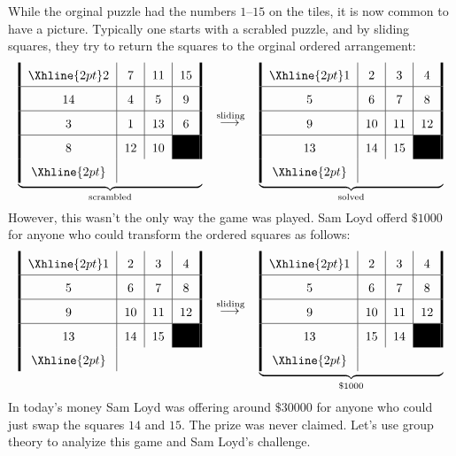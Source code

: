 \documentclass{ximera}
\begin{document}
While the orginal puzzle had the numbers $1$--$15$ on the tiles, it is
now common to have a picture. Typically one starts with a scrabled
puzzle, and by sliding squares, they try to return the squares to the
orginal ordered arrangement:
\[
\arraycolsep=6pt\def\arraystretch{1.6}
\underbrace{\begin{array}{!{\vline width 2pt}c|c|c|c!{\vline width 2pt}}
    \Xhline{2pt}
    2 & 7  & 11 & 15\\ \hline
    14 & 4  & 5  & 9 \\ \hline
    3  & 1  & 13 & 6  \\ \hline
    8  & 12 & 10 & \cellcolor{black}\\%
    \Xhline{2pt}
\end{array}}_{\text{scrambled}}
\quad\lto^{\text{sliding}}\quad
\underbrace{\begin{array}{!{\vline width 2pt}c|c|c|c!{\vline width 2pt}}
    \Xhline{2pt}
    1  & 2  & 3  & 4 \\ \hline
    5  & 6  & 7  & 8 \\ \hline
    9  & 10 & 11 & 12 \\ \hline
    13 & 14 & 15 & \cellcolor{black}\\%
    \Xhline{2pt}
\end{array}}_{\text{solved}}
\]
However, this wasn't the only way the game was played. Sam Loyd offerd
$\$1000$ for anyone who could transform the ordered squares as
follows:
\[
\arraycolsep=6pt\def\arraystretch{1.6}
\begin{array}{!{\vline width 2pt}c|c|c|c!{\vline width 2pt}}
    \Xhline{2pt}
    1  & 2  & 3  & 4 \\ \hline
    5  & 6  & 7  & 8 \\ \hline
    9  & 10 & 11 & 12 \\ \hline
    13 & 14 & 15 & \cellcolor{black} \\
    \Xhline{2pt}
\end{array}\quad\lto^{\text{sliding}}\quad
\underbrace{\begin{array}{!{\vline width 2pt}c|c|c|c!{\vline width 2pt}}
    \Xhline{2pt}
    1  & 2  & 3  & 4 \\ \hline
    5  & 6  & 7  & 8 \\ \hline
    9  & 10 & 11 & 12 \\ \hline
    13 & 15 & 14 & \cellcolor{black} \\
    \Xhline{2pt}
\end{array}}_{\$1000}
\]
In today's money Sam Loyd was offering around $\$30000$ for anyone who
could just swap the squares $14$ and $15$. The prize was never
claimed. Let's use group theory to analyize this game and Sam Loyd's
challenge.
\end{document}
